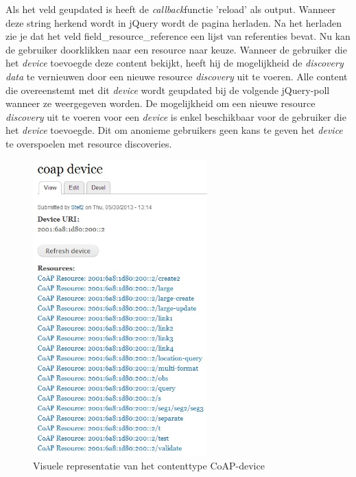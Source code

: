 Als het veld geupdated is heeft de \textit{callback}functie 'reload' als output. Wanneer deze string herkend wordt in jQuery wordt de pagina herladen. Na het herladen zie je dat het veld field\_resource\_reference een lijst van referenties bevat. Nu kan de gebruiker doorklikken naar een resource naar keuze. Wanneer de gebruiker die het \textit{device} toevoegde deze content bekijkt, heeft hij de mogelijkheid de \textit{discovery data} te vernieuwen door een nieuwe resource \textit{discovery} uit te voeren. Alle content die overeenstemt met dit \textit{device} wordt geupdated bij de volgende jQuery-poll wanneer ze weergegeven worden. De mogelijkheid om een nieuwe resource \textit{discovery} uit te voeren voor een \textit{device} is enkel beschikbaar voor de gebruiker die het \textit{device} toevoegde. Dit om anonieme gebruikers geen kans te geven het \textit{device} te overspoelen met resource discoveries.
\begin{figure}[h!]
\centering
\includegraphics[width=0.6\textwidth]{fig/coap_device}
\caption{Visuele representatie van het contenttype CoAP-device}
\label{fig:coapDevice}
\end{figure}



